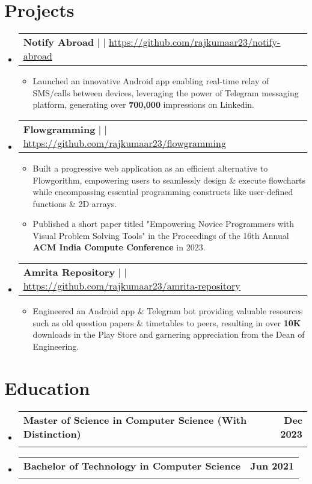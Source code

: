 \documentclass[letterpaper,11pt]{article}
\makeatletter
\newcommand{\resumeItem}[1]{
  \item\small{
    {#1 \vspace{-2pt}}
  }
}
\newcommand{\resumeSubheading}[4]{
  \vspace{-2pt}\item
    \begin{tabular*}{1.0\textwidth}[t]{l@{\extracolsep{\fill}}r}
      \textbf{#1} & \textbf{\small #2} \\
      \text{\small#3} & \text{\small #4} \\
    \end{tabular*}\vspace{-7pt}
}
\newcommand{\resumeProjectHeading}[2]{
    \item
    \begin{tabular*}{1.001\textwidth}{l@{\extracolsep{\fill}}r}
      \small#1 & \textbf{\small #2}\\
    \end{tabular*}\vspace{-7pt}
}
\newcommand{\resumeSubHeadingListStart}{\begin{itemize}[leftmargin=0.0in, label={}]}
\newcommand{\resumeSubHeadingListEnd}{\end{itemize}}
\newcommand{\resumeItemListStart}{\begin{itemize}}
\newcommand{\resumeItemListEnd}{\end{itemize}\vspace{-5pt}}
\makeatother
\begin{document}
\section{Projects}
\vspace{-5pt}
\resumeSubHeadingListStart
\resumeProjectHeading
{\textbf{Notify Abroad} $|$ \text{Android, Java} $|$ \href{https://github.com/rajkumaar23/notify-abroad}{\underline{https://github.com/rajkumaar23/notify-abroad}}}{}
\resumeItemListStart
\resumeItem{Launched an innovative Android app enabling real-time relay of SMS/calls between devices, leveraging the power of Telegram messaging platform, generating over \textbf{700,000} impressions on Linkedin.}
\resumeItemListEnd 
\vspace{-17pt}
\resumeProjectHeading
{\textbf{Flowgramming} $|$ \text{HTML, Bootstrap, jQuery,  JointJS} $|$ \href{https://github.com/rajkumaar23/flowgramming/}{\underline{https://github.com/rajkumaar23/flowgramming}}}{}
\resumeItemListStart
\resumeItem{Built a progressive web application as an efficient alternative to Flowgorithm, empowering users to seamlessly design \& execute flowcharts while encompassing essential programming constructs like user-defined functions \& 2D arrays.}
\resumeItem{Published a short paper titled "Empowering Novice Programmers with Visual Problem Solving Tools" in the Proceedings of the 16th Annual \textbf{ACM India Compute Conference} in 2023.}
\resumeItemListEnd 
\vspace{-17pt}
\resumeProjectHeading
{\textbf{Amrita Repository} $|$ \text{Android, SQLite, Web Scraping, PHP, Python} $|$ \href{https://github.com/rajkumaar23/amrita-repository}{\underline{https://github.com/rajkumaar23/amrita-repository}}}{}
\resumeItemListStart
\resumeItem{Engineered an Android app  \& Telegram bot providing valuable resources such as old question papers \& timetables to peers, resulting in over \textbf{10K} downloads in the Play Store and garnering appreciation from the Dean of Engineering.}
\resumeItemListEnd
\resumeSubHeadingListEnd
\vspace{-10pt}

\section{Education}
\resumeSubHeadingListStart
\resumeSubheading  {Master of Science in Computer Science (With Distinction)}{Dec 2023} {Arizona State University $|$ {Tempe, AZ, USA}} {GPA : 4.0/4.0}
\resumeSubheading  {Bachelor of Technology in Computer Science}{Jun 2021} {Amrita Vishwa Vidyapeetham $|$ {Coimbatore, TN, India}} {GPA : 8.6/10}
\resumeSubHeadingListEnd
\vspace{-8pt}
\end{document}
